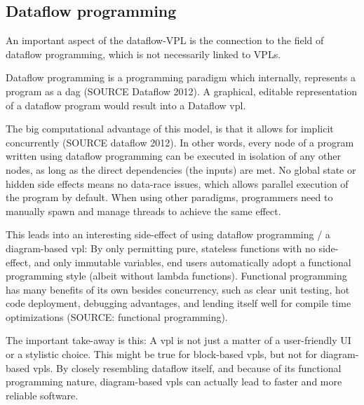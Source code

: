 \subsection{Dataflow programming}
\label{sec:background:dataflow}
An important aspect of the dataflow-VPL is the connection to the field of dataflow programming, which is not necessarily linked to VPLs. 

Dataflow programming is a programming paradigm which internally, represents a program as a \ac{dag} (SOURCE Dataflow 2012). 
A graphical, editable representation of a dataflow program would result into a Dataflow \ac{vpl}.

The big computational advantage of this model, is that it allows for implicit concurrently (SOURCE dataflow 2012). 
In other words, every node of a program written using dataflow programming can be executed in isolation of any other nodes, as long as the direct dependencies (the inputs) are met. 
No global state or hidden side effects means no data-race issues, which allows parallel execution of the program by default.
When using other paradigms, programmers need to manually spawn and manage threads to achieve the same effect. 

This leads into an interesting side-effect of using dataflow programming / a diagram-based \ac{vpl}: 
By only permitting pure, stateless functions with no side-effect, and only immutable variables, end users automatically adopt a functional programming style (albeit without lambda functions).
Functional programming has many benefits of its own besides concurrency, such as clear unit testing, hot code deployment, debugging advantages, and lending itself well for compile time optimizations (SOURCE: functional programming).




The important take-away is this: 
A \ac{vpl} is not just a matter of a user-friendly UI or a stylistic choice.
This might be true for block-based vpls, but not for diagram-based vpls. 
By closely resembling dataflow itself, and because of its functional programming nature, diagram-based vpls can actually lead to faster and more reliable software.


